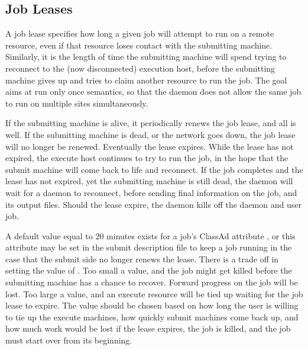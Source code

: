 \subsection{\label{sec:Job-Lease}
Job Leases}

A job lease specifies how long a given job will attempt to run
on a remote resource,
even if that resource loses contact with the submitting machine.
Similarly, it is the length of time the submitting machine will
spend trying to reconnect to the (now disconnected) execution host,
before the submitting machine gives up and tries to claim
another resource to run the job.
The goal aims at run only once semantics,
so that the  daemon does not allow the same job
to run on multiple sites simultaneously.

If the submitting machine is alive,
it periodically renews the job lease,
and all is well.
If the submitting machine is dead,
or the network goes down, the job lease will no longer be renewed.
Eventually the lease expires.
While the lease has not expired,
the execute host continues to try to run the job,
in the hope that the submit machine will come back to life
and reconnect.
If the job completes and the lease has not expired, yet the 
submitting machine is still dead,
the  daemon will wait for a
 daemon to reconnect, 
before sending final information on the job,
and its output files.
Should the lease expire, the  daemon
kills off the  daemon and user job.

A default value equal to 20 minutes exists for a job's
ClassAd attribute , 
or this attribute may be set in the submit description file
to keep a job running in the case that the submit side no longer
renews the lease.
There is a trade off in setting the value of . 
Too small a value,
and the job might get killed before the submitting machine has a
chance to recover.
Forward progress on the job will be lost.
Too large a value,
and an execute resource will be tied up waiting for the job lease to expire.
The value should be chosen based on how long the user is willing to tie up
the execute machines, how quickly submit machines come  back up,
and how much work would be lost if the lease expires,
the job is killed, and the job must start over from its beginning.

